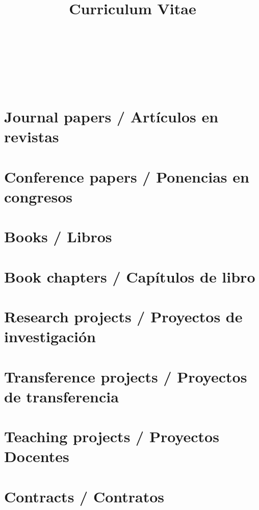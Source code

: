 \documentclass{article}
\title{Curriculum Vitae}
\author{
  \begin{tabular}{c}
      \\
    ~\\
     \\
     \\
     \\
    ~\\
     \\
    
  \end{tabular}
}
\begin{document}
\maketitle

\tableofcontents

\renewcommand{\refname}{}
\section{Journal papers / Artículos en revistas}


\renewcommand{\refname}{}
\section{Conference papers / Ponencias en congresos}


\renewcommand{\refname}{}
\section{Books / Libros}


\renewcommand{\refname}{}
\section{Book chapters / Capítulos de libro}


\renewcommand{\refname}{}
\section{Research projects / Proyectos de investigación}


\renewcommand{\refname}{}
\section{Transference projects / Proyectos de transferencia}


\renewcommand{\refname}{}
\section{Teaching projects / Proyectos Docentes}


\renewcommand{\refname}{}
\section{Contracts / Contratos}

\end{document}
